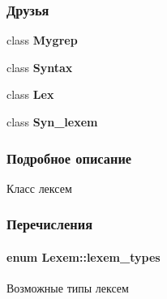 \subsubsection*{Друзья}
\begin{DoxyCompactItemize}
\item 
\hypertarget{class_lexem_a90fdb1ff12233c504810e346b5f6e49f}{}class {\bfseries Mygrep}\label{class_lexem_a90fdb1ff12233c504810e346b5f6e49f}

\item 
\hypertarget{class_lexem_a13fb68a36cac69480f7fd4b3900594f9}{}class {\bfseries Syntax}\label{class_lexem_a13fb68a36cac69480f7fd4b3900594f9}

\item 
\hypertarget{class_lexem_a1bd3ddc25649d03c17431b42bd4ad50d}{}class {\bfseries Lex}\label{class_lexem_a1bd3ddc25649d03c17431b42bd4ad50d}

\item 
\hypertarget{class_lexem_a8b6b352adcaf7ac2805f59bb6204794e}{}class {\bfseries Syn\+\_\+lexem}\label{class_lexem_a8b6b352adcaf7ac2805f59bb6204794e}

\end{DoxyCompactItemize}


\subsubsection{Подробное описание}
Класс лексем 

\subsubsection{Перечисления}
\hypertarget{class_lexem_af335177220e991d190a36fabef7ecbf4}{}
\paragraph[{lexem\+\_\+types}]{\setlength{\rightskip}{0pt plus 5cm}enum {\bf Lexem\+::lexem\+\_\+types}\hspace{0.3cm}{\ttfamily [private]}}\label{class_lexem_af335177220e991d190a36fabef7ecbf4}


Возможные типы лексем 

